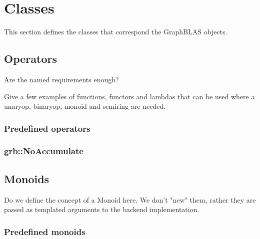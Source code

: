 \chapter{Classes}
\label{Chp:Classes}


This section defines the classes that correspond the GraphBLAS objects.

\section{Operators}



Are the named requirements enough?

Give a few examples of functions, functors and lambdas  that can be used where a unaryop, binaryop, monoid and semiring are needed.

\subsection{Predefined operators}


\subsection{\sf grb::NoAccumulate}

\section{Monoids}

Do we define the concept of a Monoid here.  We don't "new" them, rather they
are passed as templated arguments to the backend implementation.


\subsection{Predefined monoids}


